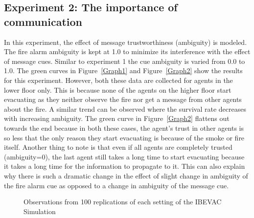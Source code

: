 
\subsection{Experiment 2:  The importance of communication}
\label{experiment2}

In this experiment, the effect of message trustworthiness (ambiguity) is modeled. The fire alarm ambiguity is kept at 1.0 to minimize its interference with the effect of message cues. Similar to experiment 1 the cue ambiguity is varied from 0.0 to 1.0. The green curves in Figure~\ref{Graph1} and Figure~\ref{Graph2} show the results for this experiment. However, both these data are collected for agents in the lower floor only. This is because none of the agents on the higher floor start evacuating as they neither observe the fire nor get a message from other agents about the fire. A similar trend can be observed where the survival rate decreases with increasing ambiguity. The green curve in Figure~\ref{Graph2} flattens out towards the end because in both these cases, the agent's trust in other agents is so less that the only reason they start evacuating is because of the smoke or fire itself. Another thing to note is that even if all agents are completely trusted (ambiguity=0), the last agent still takes a long time to start evacuating because it takes a long time for the information to propagate to it. This can also explain why there is such a dramatic change in the effect of slight change in ambiguity of the fire alarm cue as opposed to a change in ambiguity of the message cue.



\begin{figure}[!tb]
  \caption{Observations from 100 replications of each setting of the IBEVAC Simulation}
  \label{Exp4}
\end{figure}



